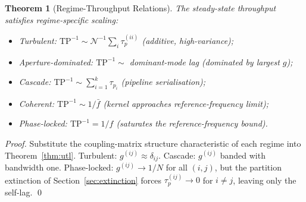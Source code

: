 \documentclass[twocolumn,11pt,a4paper]{article}
\newtheorem{theorem}{Theorem}[section]
\newcommand{\TP}{\mathrm{TP}}
\newcommand{\taup}{\tau_p}
\newcommand{\Norm}{\mathcal{N}}
\begin{document}
\begin{theorem}[Regime-Throughput Relations]
\label{thm:regime-tp}
The steady-state throughput satisfies regime-specific scaling:
\begin{itemize}[nosep,leftmargin=*]
\item Turbulent: $\TP^{-1} \sim \Norm^{-1}\sum_i \taup^{(ii)}$ (additive, high-variance);
\item Aperture-dominated: $\TP^{-1} \sim$ dominant-mode lag (dominated by largest $g$);
\item Cascade: $\TP^{-1} \sim \sum_{i=1}^k \taup_i$ (pipeline serialisation);
\item Coherent: $\TP^{-1} \sim 1/\bar{f}$ (kernel approaches reference-frequency limit);
\item Phase-locked: $\TP^{-1} = 1/f$ (saturates the reference-frequency bound).
\end{itemize}
\end{theorem}

\begin{proof}
Substitute the coupling-matrix structure characteristic of each regime into Theorem~\ref{thm:utl}. Turbulent: $g^{(ij)} \approx \delta_{ij}$. Cascade: $g^{(ij)}$ banded with bandwidth one. Phase-locked: $g^{(ij)} \to 1/N$ for all $(i,j)$, but the partition extinction of Section~\ref{sec:extinction} forces $\taup^{(ij)} \to 0$ for $i \neq j$, leaving only the self-lag. \qed
\end{proof}
\end{document}
